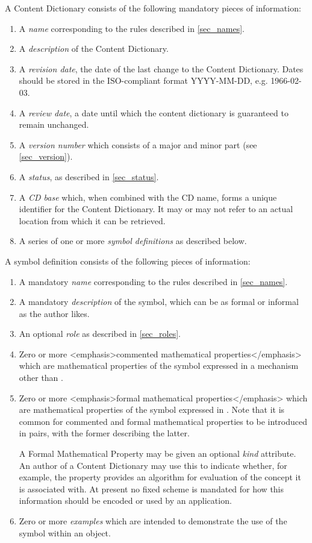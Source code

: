 A Content Dictionary consists of the following mandatory pieces of information:
\begin{enumerate}
\item A \emph{name} corresponding to the rules described in \ref{sec_names}.
\item A \emph{description} of the Content Dictionary.
\item A \emph{revision date}, the date of the last change to the Content Dictionary.
  Dates should be stored in the ISO-compliant format YYYY-MM-DD, e.g. 1966-02-03.
\item A \emph{review date}, a date until which the content dictionary is guaranteed to
  remain unchanged.
\item A \emph{version number} which consists of a major and minor part (see
  \ref{sec_version}).
\item A \emph{status}, as described in \ref{sec_status}.
\item A \emph{CD base} which, when combined with the CD name, forms a unique identifier
  for the Content Dictionary. It may or may not refer to an actual location from which it
  can be retrieved.
\item A series of one or more \emph{symbol definitions} as described below.
\end{enumerate}
A symbol definition consists of the following pieces of information:
\begin{enumerate}
\item A mandatory \emph{name} corresponding to the rules described in \ref{sec_names}.
\item A mandatory \emph{description} of the symbol, which can be as formal or informal as
  the author likes.
\item An optional \emph{role} as described in \ref{sec_roles}.
\item Zero or more <emphasis>commented mathematical properties</emphasis> which are
  mathematical properties of the symbol expressed in a mechanism other than \OM.
\item Zero or more <emphasis>formal mathematical properties</emphasis> which are
  mathematical properties of the symbol expressed in \OM.  Note that it is common for
  commented and formal mathematical properties to be introduced in pairs, with the former
  describing the latter.
	  
  A Formal Mathematical Property may be given an optional \emph{kind} attribute.  An
  author of a Content Dictionary may use this to indicate whether, for example, the
  property provides an algorithm for evaluation of the concept it is associated with.  At
  present no fixed scheme is mandated for how this information should be encoded or used
  by an application.
\item Zero or more \emph{examples} which are intended to demonstrate the use of the symbol
  within an \OM object.
\end{enumerate}
